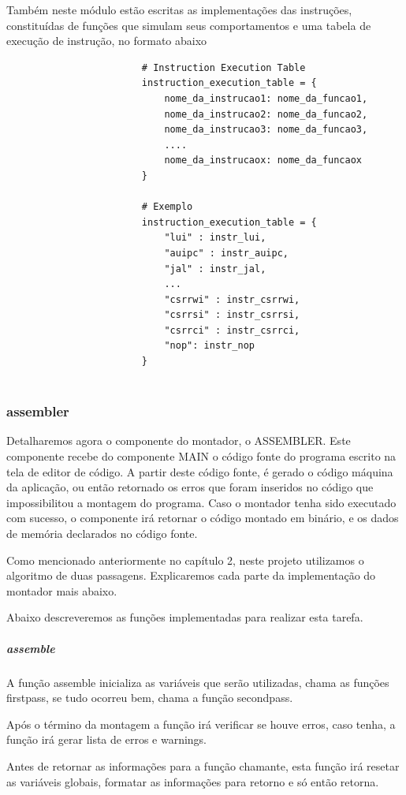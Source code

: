 					Também neste módulo estão escritas as implementações das instruções, constituídas de funções que simulam seus comportamentos e uma tabela de execução de instrução, no formato abaixo


					\begin{verbatim}
						# Instruction Execution Table
						instruction_execution_table = { 
						    nome_da_instrucao1: nome_da_funcao1,
						    nome_da_instrucao2: nome_da_funcao2,
						    nome_da_instrucao3: nome_da_funcao3,						    
						    ....
						    nome_da_instrucaox: nome_da_funcaox
						}						  		    
						
						# Exemplo
						instruction_execution_table = {
						    "lui" : instr_lui,
						    "auipc" : instr_auipc,
						    "jal" : instr_jal,
						    ...
						    "csrrwi" : instr_csrrwi,
						    "csrrsi" : instr_csrrsi,
						    "csrrci" : instr_csrrci,
						    "nop": instr_nop
						}


					\end{verbatim}

		\subsubsection{assembler}			
			
			Detalharemos agora o componente do montador, o ASSEMBLER. Este componente recebe do componente MAIN o código fonte do programa escrito na tela de editor de código. A partir deste código fonte, é gerado o código máquina da aplicação, ou então retornado os erros que foram inseridos no código que impossibilitou a montagem do programa. Caso o montador tenha sido executado com sucesso, o componente irá retornar o código montado em binário, e os dados de memória declarados no código fonte.

			Como mencionado anteriormente no capítulo 2, neste projeto utilizamos o algoritmo de duas passagens. Explicaremos cada parte da implementação do montador mais abaixo.

			Abaixo descreveremos as funções implementadas para realizar esta tarefa.

			\subparagraph{assemble}
				A função assemble inicializa as variáveis que serão utilizadas, chama as funções first\textunderscore pass, se tudo ocorreu bem, chama a função second\textunderscore pass. 

				Após o término da montagem a função irá verificar se houve erros, caso tenha, a função irá gerar lista de erros e warnings.

				Antes de retornar as informações para a função chamante, esta função irá resetar as variáveis globais, formatar as informações para retorno e só então retorna.

